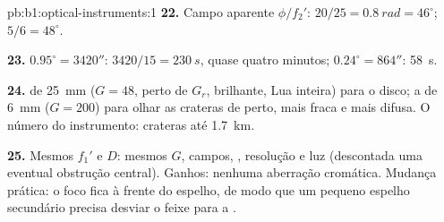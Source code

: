 \begin{solution}{pb:b1:optical-instruments:1}
\textbf{22.} Campo aparente $\phi/f_2'$: $20/25 = \qty{0.8}{rad} = 46^\circ$;
$5/6 = 48^\circ$.

\textbf{23.} $0.95^\circ = 3420''$: $3420/15 = \qty{230}{s}$, quase quatro
minutos; $0.24^\circ = 864''$: \qty{58}{s}.

\textbf{24.}  de \qty{25}{mm} ($G = 48$, perto de $G_r$, brilhante, Lua
inteira) para o disco; a de \qty{6}{mm} ($G = 200$) para olhar as crateras de perto,
mais fraca e mais difusa. O número do instrumento: crateras até
\qty{1.7}{km}.

\textbf{25.} Mesmos $f_1'$ e $D$: mesmos $G$, campos, ,
resolução e luz (descontada uma eventual obstrução central). Ganhos: nenhuma
aberração cromática. Mudança prática: o foco fica à frente do
espelho, de modo que um pequeno espelho secundário precisa desviar o feixe para
a .
\end{solution}
